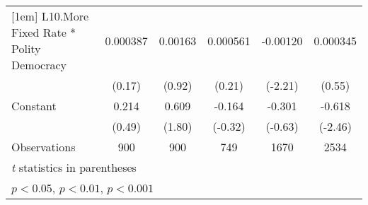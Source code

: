 {\begin{tabular}{l*{5}{c}}
[1em]
L10.More Fixed Rate * Polity Democracy& 0.000387         &  0.00163         & 0.000561         & -0.00120\sym{*}  & 0.000345         \\
                &   (0.17)         &   (0.92)         &   (0.21)         &  (-2.21)         &   (0.55)         \\
[1em]
Constant        &    0.214         &    0.609         &   -0.164         &   -0.301         &   -0.618\sym{*}  \\
                &   (0.49)         &   (1.80)         &  (-0.32)         &  (-0.63)         &  (-2.46)         \\
\hline
Observations    &      900         &      900         &      749         &     1670         &     2534         \\
\hline\hline
\multicolumn{6}{l}{\footnotesize \textit{t} statistics in parentheses}\\
\multicolumn{6}{l}{\footnotesize \sym{*} \(p<0.05\), \sym{**} \(p<0.01\), \sym{***} \(p<0.001\)}\\
\end{tabular}
}
